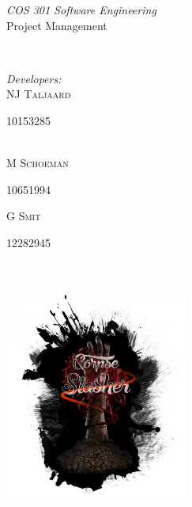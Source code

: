 \documentclass[letterpaper]{article}
\makeatletter
\def\printauthor{%
    {\large \@author}}
\makeatother
\begin{document}
\begin{titlepage}
\begin{center}
\begin{minipage}{0.4\textwidth}
\begin{flushleft} \large
\emph{COS 301 Software Engineering}\\
\vspace{1cm}Project Management
\end{flushleft}
\end{minipage}
~
\begin{minipage}{0.4\textwidth}
	\begin{flushright} \large
	\emph{Developers:} \\
		NJ \textsc{Taljaard} \\
			\begin{small}
				10153285
			\end{small} \\
		M  \textsc{Schoeman} \\
			\begin{small}
				10651994 \\
			\end{small}
		G  \textsc{Smit} \\
			\begin{small}
				12282945
			\end{small}
	\end{flushright}
\end{minipage}\\



\includegraphics[width=60mm, height=80mm]{corpseslasher.png}\\ %
 
\end{center}
\vfill %

\end{titlepage}
\end{document}
